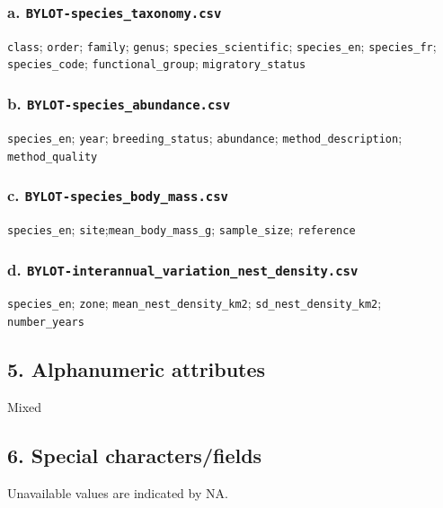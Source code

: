 \documentclass[a4paper,twoside,12pt]{article}
\begin{document}
                                \subsubsection*{a. \texttt{BYLOT-species\_taxonomy.csv}}
                                \texttt{class}; \texttt{order}; \texttt{family}; \texttt{genus}; \texttt{species\_scientific}; \texttt{species\_en}; \texttt{species\_fr}; \texttt{species\_code}; \texttt{functional\_group}; \texttt{migratory\_status}
                                
                                \subsubsection*{b. \texttt{BYLOT-species\_abundance.csv}}
                                \texttt{species\_en}; \texttt{year}; \texttt{breeding\_status}; \texttt{abundance}; \texttt{method\_description}; \texttt{method\_quality}
                                
                                \subsubsection*{c. \texttt{BYLOT-species\_body\_mass.csv}}
                                \texttt{species\_en}; \texttt{site};\texttt{mean\_body\_mass\_g}; \texttt{sample\_size}; \texttt{reference}
                                
                                \subsubsection*{d. \texttt{BYLOT-interannual\_variation\_nest\_density.csv}}
                                \texttt{species\_en}; \texttt{zone}; \texttt{mean\_nest\_density\_km2}; \texttt{sd\_nest\_density\_km2}; \texttt{number\_years}
                        
                        \subsection*{5. Alphanumeric attributes} Mixed
                        
                        \subsection*{6. Special characters/fields} Unavailable values are indicated by NA.
                        
\end{document}
